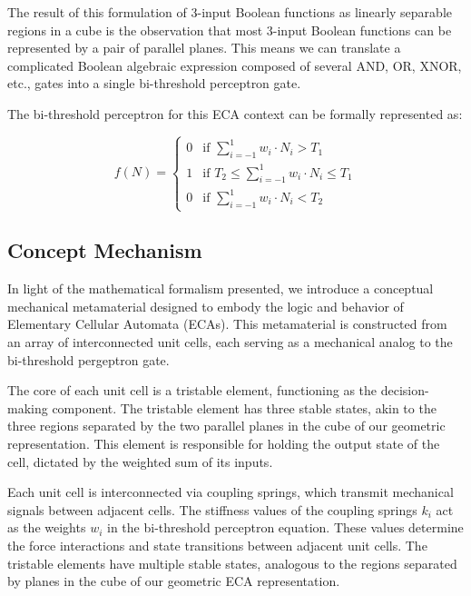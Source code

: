 The result of this formulation of 3-input Boolean functions as linearly separable regions in a cube is the observation that most 3-input Boolean functions can be represented by a pair of parallel planes. This means we can translate a complicated Boolean algebraic expression composed of several AND, OR, XNOR, etc., gates into a single bi-threshold perceptron gate.

The bi-threshold perceptron for this ECA context can be formally represented as:


\begin{equation}
    f(N) = \begin{cases} 
0 & \text{if } \sum_{i=-1}^{1} w_i \cdot N_i > T_1 \\
1 & \text{if } T_2 \leq \sum_{i=-1}^{1} w_i \cdot N_i \leq T_1 \\
0 & \text{if } \sum_{i=-1}^{1} w_i \cdot N_i < T_2
\end{cases}
\end{equation}



\subsection*{Concept Mechanism}

In light of the mathematical formalism presented, we introduce a conceptual mechanical metamaterial designed to embody the logic and behavior of Elementary Cellular Automata (ECAs). This metamaterial is constructed from an array of interconnected unit cells, each serving as a mechanical analog to the bi-threshold pergeptron gate.

The core of each unit cell is a tristable element, functioning as the decision-making component. The tristable element has three stable states, akin to the three regions separated by the two parallel planes in the cube of our geometric representation. This element is responsible for holding the output state of the cell, dictated by the weighted sum of its inputs. 

Each unit cell is interconnected via coupling springs, which transmit mechanical signals between adjacent cells. The stiffness values of the coupling springs \(k_i\) act as the weights \( w_i \) in the bi-threshold perceptron equation. These values determine the force interactions and state transitions between adjacent unit cells. The tristable elements have multiple stable states, analogous to the regions separated by planes in the cube of our geometric ECA representation.

